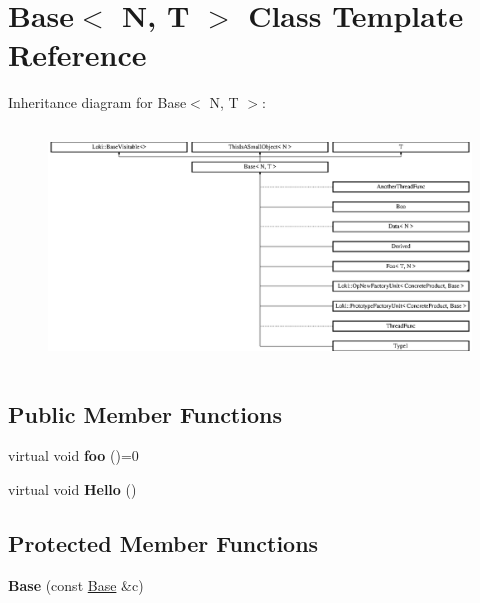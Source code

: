 \hypertarget{structBase}{}\section{Base$<$ N, T $>$ Class Template Reference}
\label{structBase}
Inheritance diagram for Base$<$ N, T $>$\+:\begin{figure}[H]
\begin{center}
\leavevmode
\includegraphics[height=6.317949cm]{structBase}
\end{center}
\end{figure}
\subsection*{Public Member Functions}
\begin{DoxyCompactItemize}
\item 
\hypertarget{structBase_a5f10f26e98780415e665cf8e63b0cb60}{}virtual void {\bfseries foo} ()=0\label{structBase_a5f10f26e98780415e665cf8e63b0cb60}

\item 
\hypertarget{structBase_a07c8f2d4e52189674bd0050e4c5a5837}{}virtual void {\bfseries Hello} ()\label{structBase_a07c8f2d4e52189674bd0050e4c5a5837}

\end{DoxyCompactItemize}
\subsection*{Protected Member Functions}
\begin{DoxyCompactItemize}
\item 
\hypertarget{structBase_a5ad6d31846af970e107ae00bc7e80aa0}{}{\bfseries Base} (const \hyperlink{structBase}{Base} \&c)\label{structBase_a5ad6d31846af970e107ae00bc7e80aa0}

\end{DoxyCompactItemize}
